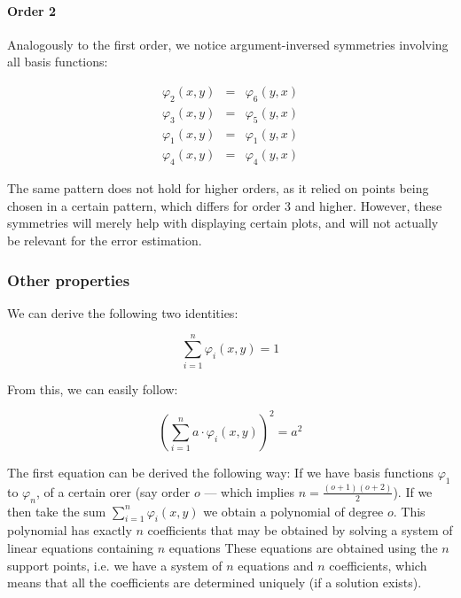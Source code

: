\documentclass{article}
\renewcommand{\phi}{\varphi}
\begin{document}
\paragraph{Order 2}

Analogously to the first order, we notice argument-inversed symmetries involving all basis functions:

\begin{eqnarray*}
  \phi_2(x,y) & = & \phi_6(y,x) \\
  \phi_3(x,y) & = & \phi_5(y,x) \\
  \phi_1(x,y) & = & \phi_1(y,x) \\
  \phi_4(x,y) & = & \phi_4(y,x)
\end{eqnarray*}

The same pattern does not hold for higher orders, as it relied on points being chosen in a certain pattern, which differs for order 3 and higher. However, these symmetries will merely help with displaying certain plots, and will not actually be relevant for the error estimation.

\subsubsection{Other properties}
\label{sec:basis-functions-other-properties}

We can derive the following two identities:

\begin{equation}
  \label{eq:sum-basis-functions-is-1}
  \sum_{i=1}^n \phi_i(x,y) = 1
\end{equation}

From this, we can easily follow:

\begin{equation}
  \label{eq:sum-basis-functions-squared}
  \left( \sum_{i=1}^n a \cdot \phi_i(x,y) \right)^2 = a^2
\end{equation}

The first equation can be derived the following way: If we have basis functions $\phi_1$ to $\phi_n$, of a certain orer (say order $o$ --- which implies $n=\frac{(o+1)(o+2)}{2}$). If we then take the sum $\sum_{i=1}^n \phi_i(x,y)$ we obtain a polynomial of degree $o$. This polynomial has exactly $n$ coefficients that may be obtained by solving a system of linear equations containing $n$ equations These equations are obtained using the $n$ support points, i.e. we have a system of $n$ equations and $n$ coefficients, which means that all the coefficients are determined uniquely (if a solution exists).
\end{document}
